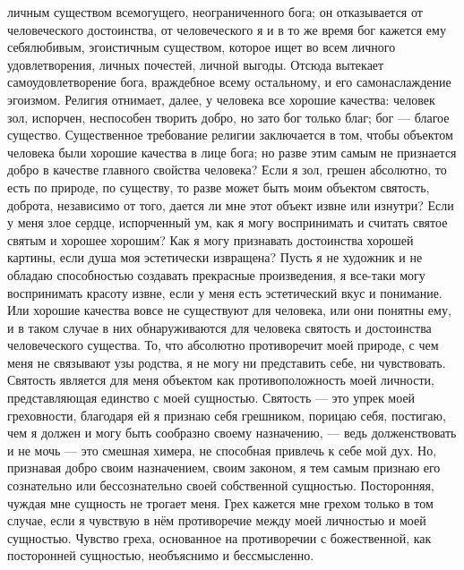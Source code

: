 \documentclass[12pt,oneside]{book}
\begin{document}
личным существом всемогущего, неограниченного бога; он отказывается от человеческого достоинства, от человеческого я и в то же время бог кажется ему себялюбивым, эгоистичным существом, которое ищет во всем личного удовлетворения, личных почестей, личной выгоды. Отсюда вытекает самоудовлетворение бога, враждебное всему остальному, и его самонаслаждение эгоизмом\ddag\let\svthefootnote\thefootnote\let\thefootnote\relax{}\let\thefootnote\svthefootnote. Религия отнимает, далее, у человека все хорошие качества: человек зол, испорчен, неспособен творить добро, но зато бог только благ; бог --- благое существо. Существенное требование религии заключается в том, чтобы объектом человека были хорошие качества в лице бога; но разве этим самым не признается добро в качестве главного свойства человека? Если я зол, грешен абсолютно, то есть по природе, по существу, то разве может быть моим объектом святость, доброта, независимо от того, дается ли мне этот объект извне или изнутри? Если у меня злое сердце, испорченный ум, как я могу воспринимать и считать святое святым и хорошее хорошим? Как я могу признавать достоинства хорошей картины, если душа моя эстетически извращена? Пусть я не художник и не обладаю способностью создавать прекрасные произведения, я все-таки могу воспринимать красоту извне, если у меня есть эстетический вкус и понимание. Или хорошие качества вовсе не существуют для человека, или они понятны ему, и в таком случае в них обнаруживаются для человека святость и достоинства человеческого существа. То, что абсолютно противоречит моей природе, с чем меня не связывают узы родства, я не могу ни представить себе, ни чувствовать. Святость является для меня объектом как противоположность моей личности, представляющая единство с моей сущностью. Святость --- это упрек моей греховности, благодаря ей я признаю себя грешником, порицаю себя, постигаю, чем я должен и могу быть сообразно своему назначению, --- ведь долженствовать и не мочь --- это смешная химера, не способная привлечь к себе мой дух. Но, признавая добро своим назначением, своим законом, я тем самым признаю его сознательно или бессознательно своей собственной сущностью. Посторонняя, чуждая мне сущность не трогает меня. Грех кажется мне грехом только в том случае, если я чувствую в нём противоречие между моей личностью и моей сущностью. Чувство греха, основанное на противоречии с божественной, как посторонней сущностью, необъяснимо и бессмысленно.
\end{document}
